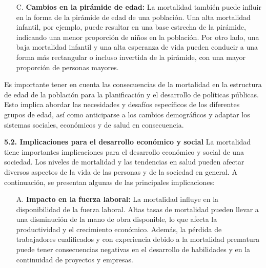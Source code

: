 \documentclass[8pt,a4paper]{beamer}
\begin{document}
{\begin{frame}{}
\setlength{\parskip}{3px}
\justifying
\begin{block}{}
\setlength{\parskip}{3px}
\justifying
\begin{enumerate}
\setlength{\parskip}{3px}
\justifying
\item[C.] \textbf{Cambios en la pirámide de edad:} La mortalidad también puede influir en la forma de la pirámide de edad de una población. Una alta mortalidad infantil, por ejemplo, puede resultar en una base estrecha de la pirámide, indicando una menor proporción de niños en la población. Por otro lado, una baja mortalidad infantil y una alta esperanza de vida pueden conducir a una forma más rectangular o incluso invertida de la pirámide, con una mayor proporción de personas mayores.
\end{enumerate}
Es importante tener en cuenta las consecuencias de la mortalidad en la estructura de edad de la población para la planificación y el desarrollo de políticas públicas. Esto implica abordar las necesidades y desafíos específicos de los diferentes grupos de edad, así como anticiparse a los cambios demográficos y adaptar los sistemas sociales, económicos y de salud en consecuencia.
\end{block}
\end{frame}

\begin{frame}{}
\setlength{\parskip}{3px}
\justifying
\begin{block}{\textbf{5.2. Implicaciones para el desarrollo económico y social}}
\setlength{\parskip}{3px}
\justifying
La mortalidad tiene importantes implicaciones para el desarrollo económico y social de una sociedad. Los niveles de mortalidad y las tendencias en salud pueden afectar diversos aspectos de la vida de las personas y de la sociedad en general. A continuación, se presentan algunas de las principales implicaciones:

\begin{enumerate}
\setlength{\parskip}{3px}
\justifying
\item[A.] \textbf{Impacto en la fuerza laboral:} La mortalidad influye en la disponibilidad de la fuerza laboral. Altas tasas de mortalidad pueden llevar a una disminución de la mano de obra disponible, lo que afecta la productividad y el crecimiento económico. Además, la pérdida de trabajadores cualificados y con experiencia debido a la mortalidad prematura puede tener consecuencias negativas en el desarrollo de habilidades y en la continuidad de proyectos y empresas.


\end{enumerate}
\end{block}
\end{frame}}
\end{document}
